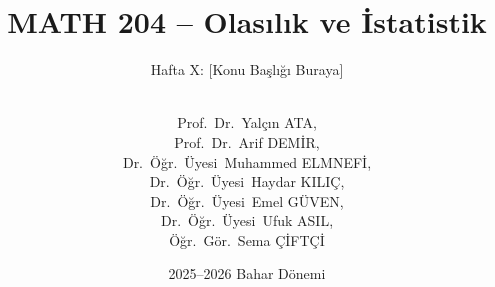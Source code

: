 
\usepackage{pgfpages}
\usepackage{ragged2e}
\usepackage{booktabs}
\usepackage{amssymb}
\usepackage{fontawesome5}
\usepackage{tikz}
\usepackage{pgfplots}
\pgfplotsset{compat=1.18}


\author[Mühendislik Fakültesi]{\\Prof.~Dr.~Yalçın ATA,\\ 
Prof.~Dr.~Arif DEMİR,\\ Dr.~Öğr.~Üyesi~Muhammed ELMNEFİ,\\ Dr.~Öğr.~Üyesi~Haydar KILIÇ,\\ Dr.~Öğr.~Üyesi~Emel GÜVEN,\\ Dr.~Öğr.~Üyesi~Ufuk ASIL,\\ Öğr.~Gör.~Sema ÇİFTÇİ} %

\title{MATH 204 -- Olasılık ve İstatistik}                     %
\subtitle{Hafta X\@: [Konu Başlığı Buraya]}                   %

\date{2025--2026 Bahar Dönemi}                                           %


